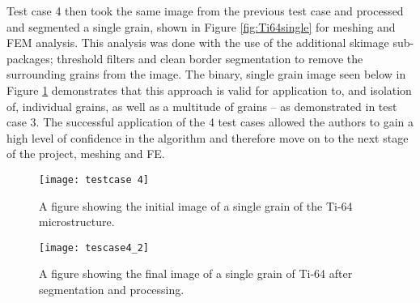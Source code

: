 \documentclass[\report.tex]{subfiles}
\begin{document}
\noindent Test case 4 then took the same image from the previous test case and processed and segmented a single grain, shown in Figure \ref{fig:Ti64single} for meshing and FEM analysis. This analysis was done with the use of the additional skimage sub-packages; threshold filters and clean border segmentation to remove the surrounding grains from the image. The binary, single grain image seen below in Figure \ref{fig:Ti64single2} demonstrates that this approach is valid for application to, and isolation of, individual grains, as well as a multitude of grains -- as demonstrated in test case 3. The successful application of the 4 test cases allowed the authors to gain a high level of confidence in the algorithm and therefore move on to the next stage of the project, meshing and FE.\\

\begin{figure}[!htb]
  \centering
  \begin{minipage}[!htb]{.5\textwidth}
    \centering\captionsetup{width=.8\linewidth}%
    \texttt{[image: testcase 4]}
    \caption{A figure showing the initial image of a single grain of the Ti-64 microstructure.}\label{fig:Ti64single}
  \end{minipage}%
  \begin{minipage}[!htb]{.5\textwidth}
    \centering\captionsetup{width=.8\linewidth}%
    \texttt{[image: tescase4\_2]}
    \caption{A figure showing the final image of a single grain of Ti-64 after segmentation and processing.}\label{fig:Ti64single2}
  \end{minipage}
\end{figure}
\end{document}
